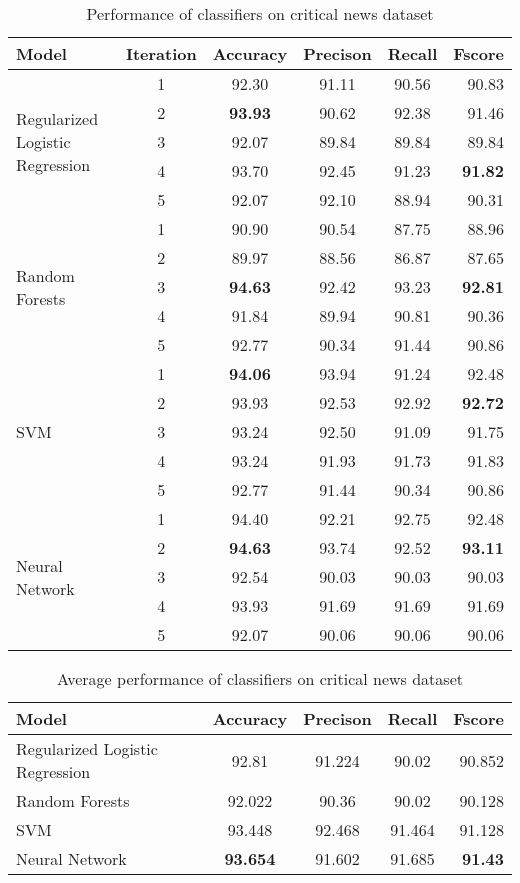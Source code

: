 \begin{table}
\begin{center}
\caption{Performance of classifiers on critical news dataset}
\label{tbl:critical_news_performance}
\begin{tabular}{lccccr}
\toprule 
Model&Iteration&Accuracy&Precison&Recall&Fscore\\
\midrule 
\multirow{5}{*}{Regularized Logistic Regression}
&1&92.30&91.11&90.56&90.83\\
&2&\textbf{93.93}&90.62&92.38&91.46\\
&3&92.07&89.84&89.84&89.84\\
&4&93.70&92.45&91.23&\textbf{91.82}\\
&5&92.07&92.10&88.94&90.31\\
\hline
\multirow{5}{*}{Random Forests}
&1&90.90&90.54&87.75&88.96\\
&2&89.97&88.56&86.87&87.65\\
&3&\textbf{94.63}&92.42&93.23&\textbf{92.81}\\
&4&91.84&89.94&90.81&90.36\\
&5&92.77&90.34&91.44&90.86\\
\hline
\multirow{5}{*}{SVM}
&1&\textbf{94.06}&93.94&91.24&92.48\\
&2&93.93&92.53&92.92&\textbf{92.72}\\
&3&93.24&92.50&91.09&91.75\\
&4&93.24&91.93&91.73&91.83\\
&5&92.77&91.44&90.34&90.86\\
\hline
\multirow{5}{*}{Neural Network}
&1&94.40&92.21&92.75&92.48\\
&2&\textbf{94.63}&93.74&92.52&\textbf{93.11}\\
&3&92.54&90.03&90.03&90.03\\
&4&93.93&91.69&91.69&91.69\\
&5&92.07&90.06&90.06&90.06\\
\bottomrule
\end{tabular}
\end{center}
\end{table}

\begin{table}
\begin{center}
\caption{Average performance of classifiers on critical news dataset}
\label{tbl:average_performance}
\begin{tabular}{lcccr}
\toprule 
Model&Accuracy&Precison&Recall&Fscore\\
\midrule 
Regularized Logistic Regression&92.81&91.224&90.02&90.852\\
Random Forests&92.022&90.36&90.02&90.128\\
SVM&93.448&92.468&91.464&91.128\\
Neural Network&\textbf{93.654}&91.602&91.685&\textbf{91.43}\\
\bottomrule
\end{tabular}
\end{center}
\end{table}

